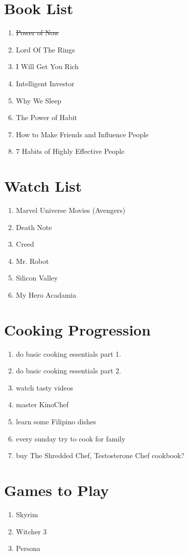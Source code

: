 \documentclass[10pt]{article}
\begin{document}
\section*{Book List}
\begin{enumerate}
    \item \sout{Power of Now}
    \item Lord Of The Rings
    \item I Will Get You Rich
    \item Intelligent Investor
    \item Why We Sleep
    \item The Power of Habit
    \item How to Make Friends and Influence People
    \item 7 Habits of Highly Effective People
\end{enumerate}

\section*{Watch List}
\begin{enumerate}
    \item Marvel Universe Movies (Avengers)
    \item Death Note
    \item Creed
    \item Mr. Robot
    \item Silicon Valley
    \item My Hero Acadamia
\end{enumerate}

\section*{Cooking Progression}
\begin{enumerate}
    \item do basic cooking essentials part 1.
    \item do basic cooking essentials part 2.
    \item watch tasty videos
    \item master KinoChef
    \item learn some Filipino dishes
    \item every sunday try to cook for family
    \item buy The Shredded Chef, Testosterone Chef cookbook?
\end{enumerate}

\section*{Games to Play}
\begin{enumerate}
    \item Skyrim
    \item Witcher 3
    \item Persona 
\end{enumerate}
\end{document}
